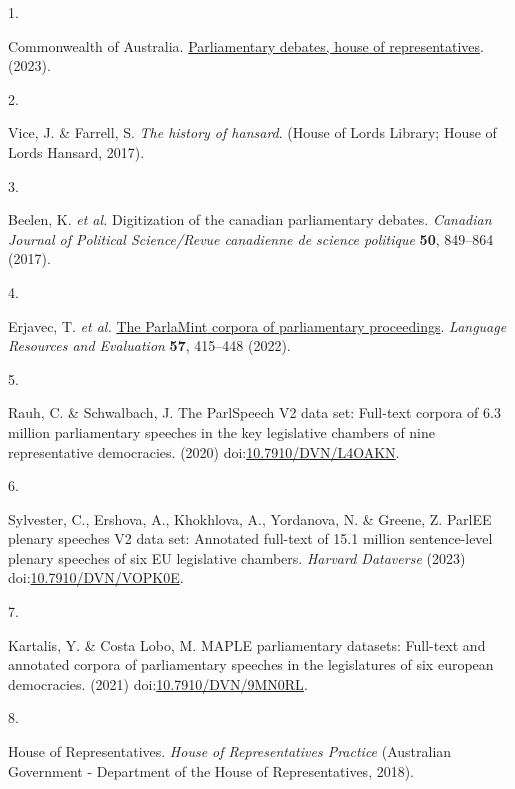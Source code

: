 \documentclass[
  letterpaper,
  DIV=11,
  numbers=noendperiod]{scrartcl}
\newlength{\cslhangindent}
\newlength{\csllabelwidth}
\newlength{\cslentryspacingunit} %
\newenvironment{CSLReferences}[2] %
 {%
  \setlength{\parindent}{0pt}
  \ifodd #1
  \let\oldpar\par
  \def\par{\hangindent=\cslhangindent\oldpar}
  \fi
  \setlength{\parskip}{#2\cslentryspacingunit}
 }%
 {}
\newcommand{\CSLLeftMargin}[1]{\parbox[t]{\csllabelwidth}{#1}}
\newcommand{\CSLRightInline}[1]{\parbox[t]{\linewidth - \csllabelwidth}{#1}\break}
\begin{document}
\hypertarget{refs}{}
\begin{CSLReferences}{0}{0}
\leavevmode{}%
\CSLLeftMargin{1. }%
\CSLRightInline{Commonwealth of Australia.
\href{https://www.aph.gov.au/Parliamentary_Business/Hansard}{Parliamentary
debates, house of representatives}. (2023).}

\leavevmode{}%
\CSLLeftMargin{2. }%
\CSLRightInline{Vice, J. \& Farrell, S. \emph{The history of hansard}.
(House of Lords Library; House of Lords Hansard, 2017).}

\leavevmode{}%
\CSLLeftMargin{3. }%
\CSLRightInline{Beelen, K. \emph{et al.} Digitization of the canadian
parliamentary debates. \emph{Canadian Journal of Political Science/Revue
canadienne de science politique} \textbf{50}, 849--864 (2017).}

\leavevmode{}%
\CSLLeftMargin{4. }%
\CSLRightInline{Erjavec, T. \emph{et al.}
\href{https://doi.org/10.1007/s10579-021-09574-0}{The {ParlaMint}
corpora of parliamentary proceedings}. \emph{Language Resources and
Evaluation} \textbf{57}, 415--448 (2022).}

\leavevmode{}%
\CSLLeftMargin{5. }%
\CSLRightInline{Rauh, C. \& Schwalbach, J. The ParlSpeech V2 data set:
Full-text corpora of 6.3 million parliamentary speeches in the key
legislative chambers of nine representative democracies. (2020)
doi:\href{https://doi.org/10.7910/DVN/L4OAKN}{10.7910/DVN/L4OAKN}.}

\leavevmode{}%
\CSLLeftMargin{6. }%
\CSLRightInline{Sylvester, C., Ershova, A., Khokhlova, A., Yordanova, N.
\& Greene, Z. {ParlEE plenary speeches V2 data set: Annotated full-text
of 15.1 million sentence-level plenary speeches of six EU legislative
chambers}. \emph{Harvard Dataverse} (2023)
doi:\href{https://doi.org/10.7910/DVN/VOPK0E}{10.7910/DVN/VOPK0E}.}

\leavevmode{}%
\CSLLeftMargin{7. }%
\CSLRightInline{Kartalis, Y. \& Costa Lobo, M. MAPLE parliamentary
datasets: Full-text and annotated corpora of parliamentary speeches in
the legislatures of six european democracies. (2021)
doi:\href{https://doi.org/10.7910/DVN/9MN0RL}{10.7910/DVN/9MN0RL}.}

\leavevmode{}%
\CSLLeftMargin{8. }%
\CSLRightInline{House of Representatives. \emph{{House of
Representatives Practice}} ({Australian Government - Department of the
House of Representatives}, 2018).}


\end{CSLReferences}
\end{document}
